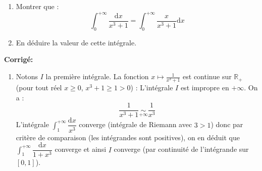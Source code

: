 \documentclass[a4paper,twoside,french,10pt]{VcCours}
\newcommand{\dx}{\text{d}x}
\newcommand{\corr}{\textbf{Corrigé:}}
\begin{document}
\begin{Exercice}{}
\begin{enumerate}
  \item
    Montrer que :
    \[
\int_{0}^{ + \infty} \frac{\dx}{x^{3} + 1} = \int_{0}^{ + \infty} \frac{x}{x^{3} + 1}\dx
    \]
  \item
    En déduire la valeur de cette intégrale.
  \end{enumerate}
\end{Exercice} 

\corr 

\begin{enumerate}
\item Notons $I$ la première intégrale. La fonction $x \mapsto \frac{1}{x^{3} + 1}$ est continue sur $\mathbb{R}_+$ (pour tout réel $x \geq 0$, $x^3+1 \geq 1>0$) : L'intégrale $I$ est impropre en $+ \infty$. On a :
$$  \frac{1}{x^{3} + 1} \underset{+ \infty}{\sim} \dfrac{1}{x^3} $$
L'intégrale $\int_1^{+\infty} \dfrac{\dx}{x^3}$ converge (intégrale de Riemann avec $3>1$) donc par critère de comparaison (les intégrandes sont positives), on en déduit que $\int_1^{+\infty} \dfrac{\dx}{1+x^3}$ converge et ainsi $I$ converge (par continuité de l'intégrande sur $[0,1]$). 

\medskip


\end{enumerate}
\end{document}
